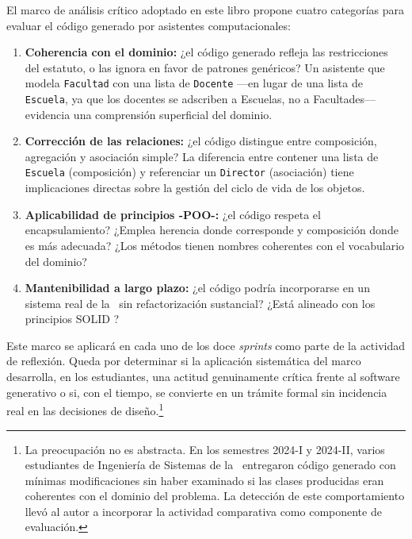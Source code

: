 El marco de análisis crítico adoptado en este libro propone cuatro
categorías para evaluar el código generado por asistentes computacionales:

\begin{enumerate}[label=\textbf{C\arabic*.}]
  \item \textbf{Coherencia con el dominio:} ¿el código generado refleja
    las restricciones del estatuto, o las ignora en favor de patrones
    genéricos? Un asistente que modela \texttt{Facultad} con una lista
    de \texttt{Docente} ---en lugar de una lista de \texttt{Escuela},
    ya que los docentes se adscriben a Escuelas, no a Facultades---
    evidencia una comprensión superficial del dominio.
  \item \textbf{Corrección de las relaciones:} ¿el código distingue
    entre composición, agregación y asociación simple? La diferencia
    entre contener una lista de \texttt{Escuela} (composición) y
    referenciar un \texttt{Director} (asociación) tiene implicaciones
    directas sobre la gestión del ciclo de vida de los objetos.
  \item \textbf{Aplicabilidad de principios -POO-:} ¿el código respeta
    el encapsulamiento? ¿Emplea herencia donde corresponde y composición
    donde es más adecuada? ¿Los métodos tienen nombres coherentes con el
    vocabulario del dominio?
  \item \textbf{Mantenibilidad a largo plazo:} ¿el código podría
    incorporarse en un sistema real de la \ud\ sin refactorización
    sustancial? ¿Está alineado con los principios \textsc{SOLID}
    \autocite{Martin2017}?
\end{enumerate}

Este marco se aplicará en cada uno de los doce \textit{sprints} como
parte de la actividad de reflexión. Queda por determinar si la aplicación
sistemática del marco desarrolla, en los estudiantes, una actitud genuinamente
crítica frente al software generativo o si, con el tiempo, se convierte
en un trámite formal sin incidencia real en las decisiones de diseño.\footnote{%
  La preocupación no es abstracta. En los semestres 2024-I y 2024-II,
  varios estudiantes de Ingeniería de Sistemas de la \ud\ entregaron
  código generado con mínimas modificaciones sin haber examinado si
  las clases producidas eran coherentes con el dominio del problema.
  La detección de este comportamiento llevó al autor a incorporar la
  actividad comparativa como componente de evaluación.}

